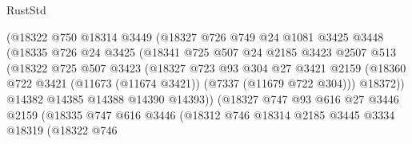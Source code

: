 \begin{lexlean}{RustStd}
\begin{coremodule}
                          (@18322
                            @750
                            @18314
                            @3449
                            (@18327
                              @726
                              @749
                              @24
                              @1081
                              @3425
                              @3448
                              (@18335
                                @726
                                @24
                                @3425
                                (@18341
                                  @725
                                  @507
                                  @24
                                  @2185
                                  @3423
                                  @2507
                                  @513
                                  (@18322
                                    @725
                                    @507
                                    @3423
                                    (@18327
                                      @723
                                      @93
                                      @304
                                      @27
                                      @3421
                                      @2159
                                      (@18360
                                        @722
                                        @3421
                                        (@11673 (@11674 @3421))
                                        (@7337 (@11679 @722 @304)))
                                      @18372))
                                  @14382
                                  @14385
                                  @14388
                                  @14390
                                  @14393))
                              (@18327
                                @747
                                @93
                                @616
                                @27
                                @3446
                                @2159
                                (@18335
                                  @747
                                  @616
                                  @3446
                                  (@18312
                                    @746
                                    @18314
                                    @2185
                                    @3445
                                    @3334
                                    @18319
                                    (@18322
                                      @746

\end{coremodule}
\end{lexlean}
